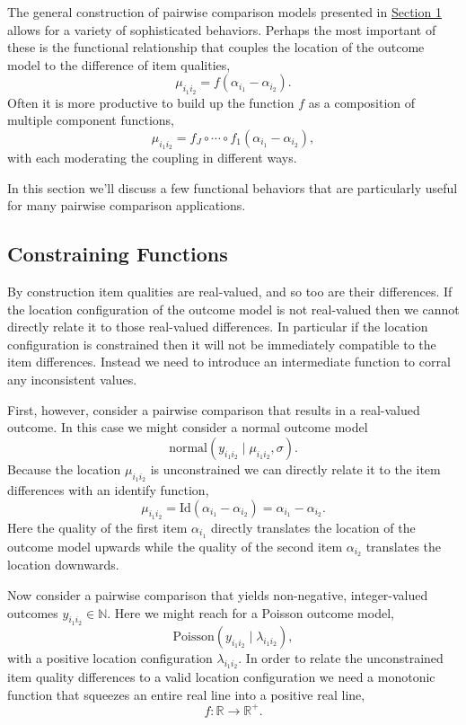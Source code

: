 \documentclass[
  letterpaper,
  DIV=11,
  numbers=noendperiod]{scrartcl}
\begin{document}
The general construction of pairwise comparison models presented in
\hyperref[sec:pair-comps]{Section 1} allows for a variety of
sophisticated behaviors. Perhaps the most important of these is the
functional relationship that couples the location of the outcome model
to the difference of item qualities, \[
\mu_{i_{1} i_{2}} = f(\alpha_{i_{1}} - \alpha_{i_{2}}).
\] Often it is more productive to build up the function \(f\) as a
composition of multiple component functions, \[
\mu_{i_{1} i_{2}}
=
f_{J} \circ \cdots \circ f_{1}(\alpha_{i_{1}} - \alpha_{i_{2}}),
\] with each moderating the coupling in different ways.

In this section we'll discuss a few functional behaviors that are
particularly useful for many pairwise comparison applications.

\subsection{Constraining Functions}\label{constraining-functions}

By construction item qualities are real-valued, and so too are their
differences. If the location configuration of the outcome model is not
real-valued then we cannot directly relate it to those real-valued
differences. In particular if the location configuration is constrained
then it will not be immediately compatible to the item differences.
Instead we need to introduce an intermediate function to corral any
inconsistent values.

First, however, consider a pairwise comparison that results in a
real-valued outcome. In this case we might consider a normal outcome
model \[
\text{normal}(y_{i_{1} i_{2}} \mid \mu_{i_{1} i_{2}}, \sigma).
\] Because the location \(\mu_{i_{1} i_{2}}\) is unconstrained we can
directly relate it to the item differences with an identify function, \[
\mu_{i_{1} i_{2}}
= \mathrm{Id}(\alpha_{i_{1}} - \alpha_{i_{2}})
= \alpha_{i_{1}} - \alpha_{i_{2}}.
\] Here the quality of the first item \(\alpha_{i_{1}}\) directly
translates the location of the outcome model upwards while the quality
of the second item \(\alpha_{i_{2}}\) translates the location downwards.

Now consider a pairwise comparison that yields non-negative,
integer-valued outcomes \(y_{i_{1} i_{2}} \in \mathbb{N}\). Here we
might reach for a Poisson outcome model, \[
\text{Poisson}(y_{i_{1} i_{2}} \mid \lambda_{i_{1} i_{2}} ),
\] with a positive location configuration \(\lambda_{i_{1} i_{2}}\). In
order to relate the unconstrained item quality differences to a valid
location configuration we need a monotonic function that squeezes an
entire real line into a positive real line, \[
f : \mathbb{R} \rightarrow \mathbb{R}^{+}.
\]
\end{document}
